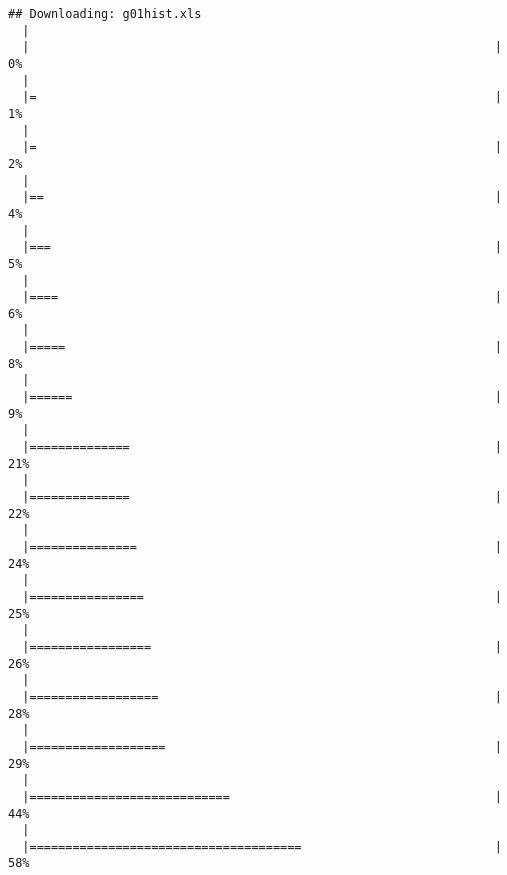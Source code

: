 \documentclass[]{article}
\begin{document}
\begin{verbatim}
## Downloading: g01hist.xls
  |                                                                       
  |                                                                 |   0%
  |                                                                       
  |=                                                                |   1%
  |                                                                       
  |=                                                                |   2%
  |                                                                       
  |==                                                               |   4%
  |                                                                       
  |===                                                              |   5%
  |                                                                       
  |====                                                             |   6%
  |                                                                       
  |=====                                                            |   8%
  |                                                                       
  |======                                                           |   9%
  |                                                                       
  |==============                                                   |  21%
  |                                                                       
  |==============                                                   |  22%
  |                                                                       
  |===============                                                  |  24%
  |                                                                       
  |================                                                 |  25%
  |                                                                       
  |=================                                                |  26%
  |                                                                       
  |==================                                               |  28%
  |                                                                       
  |===================                                              |  29%
  |                                                                       
  |============================                                     |  44%
  |                                                                       
  |======================================                           |  58%

\end{verbatim}
\end{document}
